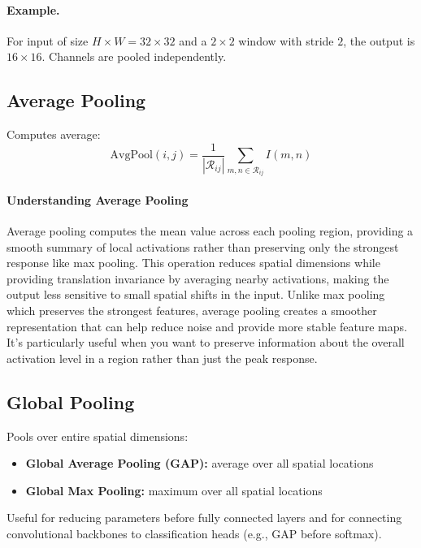 \paragraph{Example.} For input of size $H\times W=32\times32$ and a $2\times2$ window with stride $2$, the output is $16\times16$. Channels are pooled independently.

\subsection{Average Pooling}

Computes average:
\begin{equation}
\text{AvgPool}(i,j) = \frac{1}{|\mathcal{R}_{ij}|} \sum_{m,n \in \mathcal{R}_{ij}} I(m,n)
\end{equation}

\paragraph{Understanding Average Pooling}
Average pooling computes the mean value across each pooling region, providing a smooth summary of local activations rather than preserving only the strongest response like max pooling. This operation reduces spatial dimensions while providing translation invariance by averaging nearby activations, making the output less sensitive to small spatial shifts in the input. Unlike max pooling which preserves the strongest features, average pooling creates a smoother representation that can help reduce noise and provide more stable feature maps. It's particularly useful when you want to preserve information about the overall activation level in a region rather than just the peak response.

\subsection{Global Pooling}

Pools over entire spatial dimensions:
\begin{itemize}
    \item \textbf{Global Average Pooling (GAP):} average over all spatial locations
    \item \textbf{Global Max Pooling:} maximum over all spatial locations
\end{itemize}

Useful for reducing parameters before fully connected layers and for connecting convolutional backbones to classification heads (e.g., GAP before softmax).


